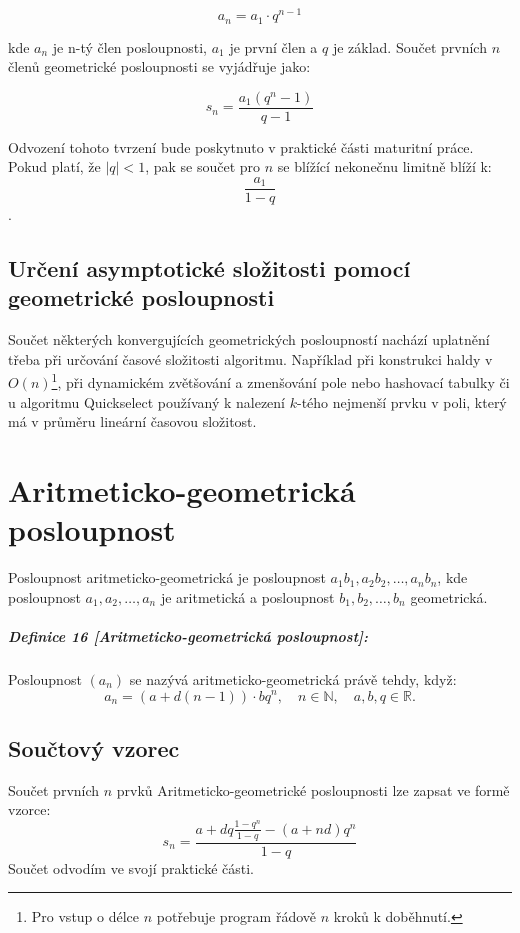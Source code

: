 \documentclass[12pt]{report}			%
\begin{document}
$$a_{n} = a_{1} \cdot q^{n-1}$$

kde $a_{n}$ je n-tý člen posloupnosti, $a_{1}$ je první člen a $q$ je základ.
Součet prvních $n$ členů geometrické posloupnosti se vyjádřuje jako:

$$s_n = \frac{a_1 (q^n - 1)}{q-1}$$

Odvození tohoto tvrzení bude poskytnuto v praktické části maturitní práce. Pokud platí, že $|q| < 1$, pak se součet pro $n$ se blížící nekonečnu limitně blíží k: $$\frac{a_1}{1-q}$$.
\section{Určení asymptotické složitosti pomocí geometrické posloupnosti}
Součet některých konvergujících geometrických posloupností nachází uplatnění třeba při určování časové složitosti algoritmu. Například při konstrukci haldy v $O(n)$\footnote{Pro vstup o délce $n$ potřebuje program řádově $n$ kroků k doběhnutí.}, při dynamickém zvětšování a zmenšování pole\supercite{1} nebo hashovací tabulky\cite{1} či u algoritmu Quickselect\cite{1} používaný k nalezení $k$-tého nejmenší prvku v poli, který má v průměru lineární časovou složitost.
\chapter{Aritmeticko-geometrická posloupnost}
Posloupnost aritmeticko-geometrická je posloupnost $a_1 b_1, a_2 b_2, \ldots, a_n b_n$, kde posloupnost $a_1, a_2, \ldots, a_n$ je aritmetická a posloupnost $b_1, b_2, \ldots, b_n$ geometrická.
\paragraph{Definice 16 [Aritmeticko-geometrická posloupnost]:}
Posloupnost $(a_n)$ se nazývá aritmeticko-geometrická právě tehdy, když:
$$a_n = (a + d(n-1)) \cdot bq^n, \quad n\in\mathbb{N}, \quad a,b,q\in\mathbb{R}.$$
\section{Součtový vzorec}
Součet prvních $n$ prvků Aritmeticko-geometrické posloupnosti lze zapsat ve formě vzorce:
$$s_n = \frac{a+dq\frac{1 - q^n}{1 - q} - (a + nd)q^n}{1-q}$$
Součet odvodím ve svojí praktické části.
\end{document}
